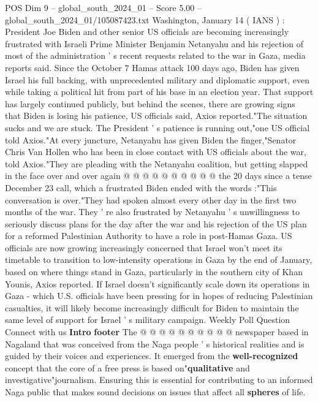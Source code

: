 \begin{textsample}{POS Dim 9 – global\_south\_2024\_01 – Score 5.00 – global\_south\_2024\_01/105087423.txt}  \label{ex:f9_pos_066}
Washington, January 14 ( IANS ) : President Joe Biden and other senior US officials are becoming increasingly frustrated with Israeli Prime Minister Benjamin Netanyahu and his rejection of most of the administration ' s recent requests related to the war in Gaza, media reports said.
Since the October 7 Hamas attack 100 days ago, Biden has given Israel his full backing, with unprecedented military and diplomatic support, even while taking a political hit from part of his base in an election year.
That support has largely continued publicly, but behind the scenes, there are growing signs that Biden is losing his patience, US officials said, Axios reported."The situation sucks and we are stuck.
The President ' s patience is running out,"one US official told Axios."At every juncture, Netanyahu has given Biden the finger,"Senator Chris Van Hollen who has been in close contact with US officials about the war, told Axios."They are pleading with the Netanyahu coalition, but getting slapped in the face over and over again @ @ @ @ @ @ @ @ @ @ the 20 days since a tense December 23 call, which a frustrated Biden ended with the words :"This conversation is over."They had spoken almost every other day in the first two months of the war.
They ' re also frustrated by Netanyahu ' s unwillingness to seriously discuss plans for the day after the war and his rejection of the US plan for a reformed Palestinian Authority to have a role in post-Hamas Gaza.
US officials are now growing increasingly concerned that Israel won't meet its timetable to transition to low-intensity operations in Gaza by the end of January, based on where things stand in Gaza, particularly in the southern city of Khan Younis, Axios reported.
If Israel doesn't significantly scale down its operations in Gaza - which U.S. officials have been pressing for in hopes of reducing Palestinian casualties, it will likely become increasingly difficult for Biden to maintain the same level of support for Israel ' s military campaign.
Weekly Poll Question Connect with us \textbf{Intro} \textbf{footer} The @ @ @ @ @ @ @ @ @ @ newspaper based in Nagaland that was conceived from the Naga people ' s historical realities and is guided by their voices and experiences.
It emerged from the \textbf{well-recognized} concept that the core of a free press is based on"\textbf{qualitative} and investigative"journalism.
Ensuring this is essential for contributing to an informed Naga public that makes sound decisions on issues that affect all \textbf{spheres} of life.

\end{textsample}
